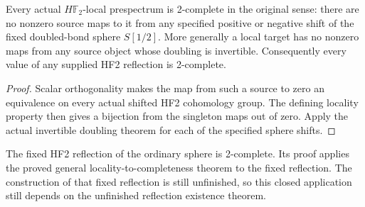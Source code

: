 \begin{proposition}
  \label{prop:actual-hf2-local-two-completeness}
  \leanok
  Every actual $H\mathbb F_2$-local prespectrum is 2-complete in the original sense: there are no nonzero source maps to it from any specified positive or negative shift of the fixed doubled-bond sphere $S[1/2]$. More generally a local target has no nonzero maps from any source object whose doubling is invertible. Consequently every value of any supplied HF2 reflection is 2-complete.
\end{proposition}
\begin{proof}
  Scalar orthogonality makes the map from such a source to zero an equivalence on every actual shifted HF2 cohomology group. The defining locality property then gives a bijection from the singleton maps out of zero. Apply the actual invertible doubling theorem for each of the specified sphere shifts.
  \leanok
\end{proof}

\begin{proposition}
  \label{prop:fixed-completed-sphere-two-completeness}
  \notready
  The fixed HF2 reflection of the ordinary sphere is 2-complete. Its proof applies the proved general locality-to-completeness theorem to the fixed reflection. The construction of that fixed reflection is still unfinished, so this closed application still depends on the unfinished reflection existence theorem.
\end{proposition}

